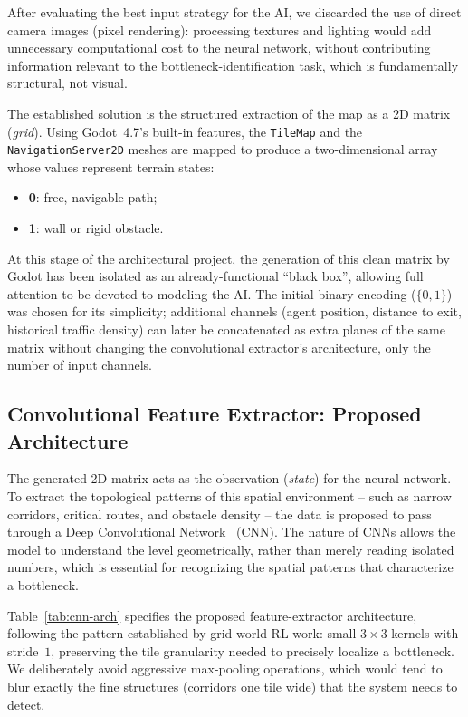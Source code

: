 \documentclass[sigconf,nonacm,language=english]{acmart}
\begin{document}
After evaluating the best input strategy for the AI, we discarded the use
of direct camera images (pixel rendering): processing textures and
lighting would add unnecessary computational cost to the neural network,
without contributing information relevant to the bottleneck-identification
task, which is fundamentally structural, not visual.

The established solution is the structured extraction of the map as a 2D
matrix (\emph{grid}). Using Godot~4.7's built-in features, the
\texttt{TileMap} and the \texttt{NavigationServer2D} meshes are mapped to
produce a two-dimensional array whose values represent terrain states:
\begin{itemize}
  \item \textbf{0}: free, navigable path;
  \item \textbf{1}: wall or rigid obstacle.
\end{itemize}

At this stage of the architectural project, the generation of this clean
matrix by Godot has been isolated as an already-functional ``black box'',
allowing full attention to be devoted to modeling the AI. The initial
binary encoding ($\{0,1\}$) was chosen for its simplicity; additional
channels (agent position, distance to exit, historical traffic density)
can later be concatenated as extra planes of the same matrix without
changing the convolutional extractor's architecture, only the number of
input channels.

\subsection{Convolutional Feature Extractor: Proposed Architecture}
\label{sec:cnn}

The generated 2D matrix acts as the observation (\emph{state}) for the
neural network. To extract the topological patterns of this spatial
environment -- such as narrow corridors, critical routes, and obstacle
density -- the data is proposed to pass through a Deep Convolutional
Network~\cite{lecun1998gradient} (CNN). The nature of CNNs allows the model
to understand the level geometrically, rather than merely reading isolated
numbers, which is essential for recognizing the spatial patterns that
characterize a bottleneck.

Table~\ref{tab:cnn-arch} specifies the proposed feature-extractor
architecture, following the pattern established by grid-world RL work: small
$3\times3$ kernels with stride~$1$, preserving the tile granularity needed
to precisely localize a bottleneck. We deliberately avoid aggressive
max-pooling operations, which would tend to blur exactly the fine
structures (corridors one tile wide) that the system needs to detect.
\end{document}

